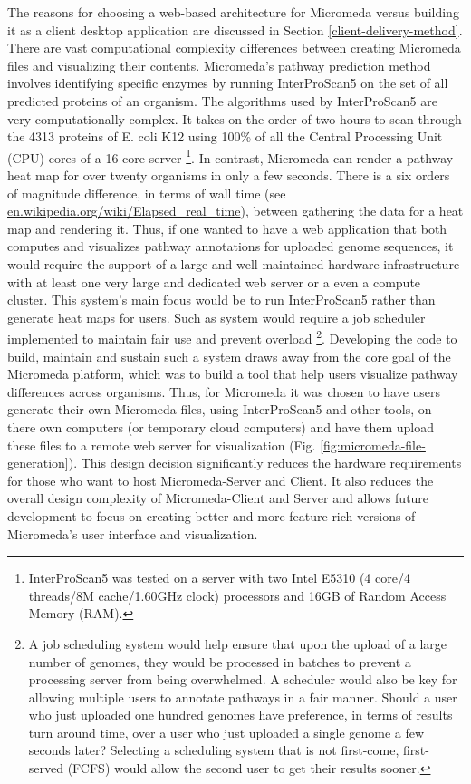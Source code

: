 The reasons for choosing a web-based architecture for Micromeda versus building it as a client desktop application are discussed in Section \ref{client-delivery-method}. There are vast computational complexity differences between creating Micromeda files and visualizing their contents. Micromeda's pathway prediction method involves identifying specific enzymes by running InterProScan5 on the set of all predicted proteins of an organism. The algorithms used by InterProScan5 are very computationally complex. It takes on the order of two hours to scan through the 4313 proteins of E. coli K12 using 100\% of all the Central Processing Unit (CPU) cores of a 16 core server \footnote{InterProScan5 was tested on a server with two Intel E5310 (4 core/4 threads/8M cache/1.60GHz clock) processors and 16GB of Random Access Memory (RAM).}. In contrast, Micromeda can render a pathway heat map for over twenty organisms in only a few seconds. There is a six orders of magnitude difference, in terms of wall time (see \href{en.wikipedia.org/wiki/Elapsed\_real\_time}{en.wikipedia.org/wiki/Elapsed\_real\_time}), between gathering the data for a heat map and rendering it. Thus, if one wanted to have a web application that both computes and visualizes pathway annotations for uploaded genome sequences, it would require the support of a large and well maintained hardware infrastructure with at least one very large and dedicated web server or a even a compute cluster. This system's main focus would be to run InterProScan5 rather than generate heat maps for users. Such as system would require a job scheduler implemented to maintain fair use and prevent overload \footnote{A job scheduling system would help ensure that upon the upload of a large number of genomes, they would be processed in batches to prevent a processing server from being overwhelmed. A scheduler would also be key for allowing multiple users to annotate pathways in a fair manner. Should a user who just uploaded one hundred genomes have preference, in terms of results turn around time, over a user who just uploaded a single genome a few seconds later? Selecting a scheduling system that is not first-come, first-served (FCFS) would allow the second user to get their results sooner.}. Developing the code to build, maintain and sustain such a system draws away from the core goal of the Micromeda platform, which was to build a tool that help users visualize pathway differences across organisms. Thus, for Micromeda it was chosen to have users generate their own Micromeda files, using InterProScan5 and other tools, on there own computers (or temporary cloud computers) and have them upload these files to a remote web server for visualization (Fig. \ref{fig:micromeda-file-generation}). This design decision significantly reduces the hardware requirements for those who want to host Micromeda-Server and Client. It also reduces the overall design complexity of Micromeda-Client and Server and allows future development to focus on creating better and more feature rich versions of Micromeda's user interface and visualization.

